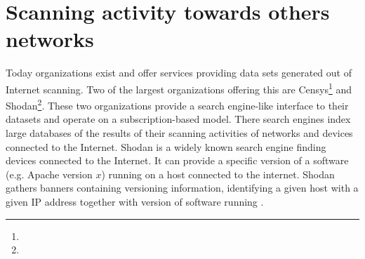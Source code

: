 \newpage
\section{Scanning activity towards others networks}
\label{s:ScanOtherNetworks}
Today organizations exist and offer services providing data sets generated out of Internet scanning. Two of the largest organizations offering this are Censys\footnote{} and Shodan\footnote{}. These two organizations provide a search engine-like interface to their datasets and operate on a subscription-based model. There search engines index large databases of the results of their scanning activities of networks and devices connected to the Internet.
Shodan is a widely known search engine finding devices connected to the Internet.
It can provide a specific version of a software (e.g. Apache version $x$) running on a host connected to the internet. Shodan gathers banners containing versioning information, identifying a given host with a given IP address together with version of software running \autocite{ShodanGuide}.
